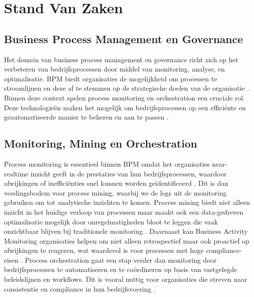 
\section{Stand Van Zaken}%
\label{sec:stand_van_zaken}
\subsection{Business Process Management en Governance}

Het domein van business process management en governance richt zich op het verbeteren van bedrijfsprocessen door middel van monitoring, analyse, en optimalisatie. BPM biedt organisaties de mogelijkheid om processen te stroomlijnen en deze af te stemmen op de strategische doelen van de organisatie \autocite{Dumas2018}. Binnen deze context spelen process monitoring en orchestration een cruciale rol. Deze technologieën maken het mogelijk om bedrijfsprocessen op een efficiënte en geautomatiseerde manier te beheren en aan te passen \autocite{Weske2019}.

\subsection{Monitoring, Mining en Orchestration}

Process monitoring is essentieel binnen BPM omdat het organisaties near-realtime inzicht geeft in de prestaties van hun bedrijfsprocessen, waardoor afwijkingen of inefficiënties snel kunnen worden geïdentificeerd \autocite{Janiesch2012}. Dit is dan voedingsbodem voor process mining, waarbij we de logs uit de monitoring gebruiken om tot analytische inzichten te komen. Process mining biedt niet alleen inzicht in het huidige verloop van processen maar maakt ook een data-gedreven optimalisatie mogelijk door onregelmatigheden bloot te leggen die vaak onzichtbaar blijven bij traditionele monitoring \autocite{Aalst2016}. Daarnaast kan Business Activity Monitoring organisaties helpen om niet alleen retrospectief maar ook proactief op afwijkingen te reageren, wat waardevol is voor processen met hoge compliance-eisen \autocite{Janiesch2012}. Process orchestration gaat een stap verder dan monitoring door bedrijfsprocessen te automatiseren en te coördineren op basis van vastgelegde beleidslijnen en workflows. Dit is vooral nuttig voor organisaties die streven naar consistentie en compliance in hun bedrijfsvoering \autocite{Weske2019}. 

